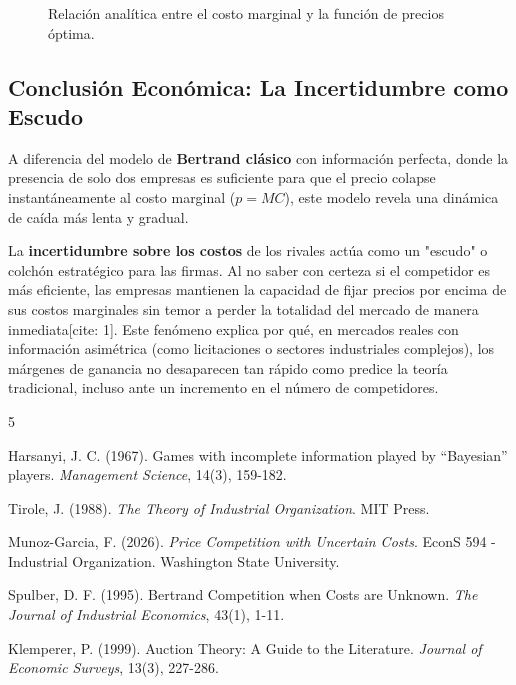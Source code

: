 \documentclass[12pt]{article}
\begin{document}
\begin{figure}[htbp]

    \vspace{0.3cm} %
    \caption{Relación analítica entre el costo marginal y la función de precios óptima.}
    \label{fig:analisis_precios}
\end{figure}

\subsection{Conclusión Económica: La Incertidumbre como Escudo}

A diferencia del modelo de \textbf{Bertrand clásico} con información perfecta, donde la presencia de solo dos empresas es suficiente para que el precio colapse instantáneamente al costo marginal ($p = MC$), este modelo revela una dinámica de caída más lenta y gradual. 

La \textbf{incertidumbre sobre los costos} de los rivales actúa como un "escudo" o colchón estratégico para las firmas. Al no saber con certeza si el competidor es más eficiente, las empresas mantienen la capacidad de fijar precios por encima de sus costos marginales sin temor a perder la totalidad del mercado de manera inmediata[cite: 1]. Este fenómeno explica por qué, en mercados reales con información asimétrica (como licitaciones o sectores industriales complejos), los márgenes de ganancia no desaparecen tan rápido como predice la teoría tradicional, incluso ante un incremento en el número de competidores.
\begin{thebibliography}{5}

Harsanyi, J. C. (1967). Games with incomplete information played by ``Bayesian'' players. \textit{Management Science}, 14(3), 159-182.

Tirole, J. (1988). \textit{The Theory of Industrial Organization}. MIT Press.

Munoz-Garcia, F. (2026). \textit{Price Competition with Uncertain Costs}. EconS 594 - Industrial Organization. Washington State University.

Spulber, D. F. (1995). Bertrand Competition when Costs are Unknown. \textit{The Journal of Industrial Economics}, 43(1), 1-11.

Klemperer, P. (1999). Auction Theory: A Guide to the Literature. \textit{Journal of Economic Surveys}, 13(3), 227-286.

\end{thebibliography}
\end{document}
